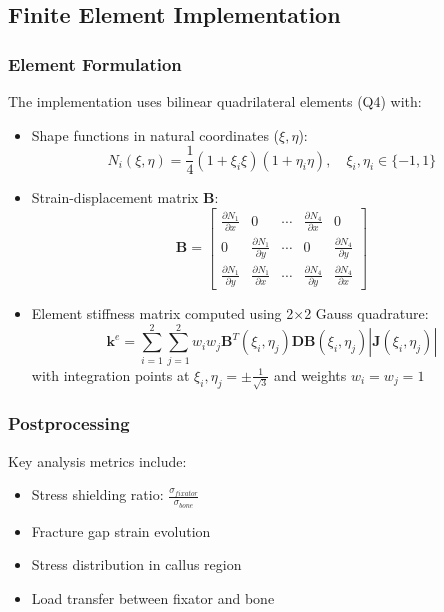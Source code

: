 \documentclass{article}
\begin{document}
\subsection{Finite Element Implementation}

\subsubsection{Element Formulation}

The implementation uses bilinear quadrilateral elements (Q4) with:
\begin{itemize}
  \item Shape functions in natural coordinates ($\xi,\eta$):
  \[
  N_i(\xi,\eta) = \frac{1}{4}(1+\xi_i\xi)(1+\eta_i\eta), \quad \xi_i,\eta_i \in \{-1,1\}
  \]
  \item Strain-displacement matrix $\mathbf{B}$:
  \[
  \mathbf{B} = \begin{bmatrix}
  \frac{\partial N_1}{\partial x} & 0 & \cdots & \frac{\partial N_4}{\partial x} & 0 \\
  0 & \frac{\partial N_1}{\partial y} & \cdots & 0 & \frac{\partial N_4}{\partial y} \\
  \frac{\partial N_1}{\partial y} & \frac{\partial N_1}{\partial x} & \cdots & \frac{\partial N_4}{\partial y} & \frac{\partial N_4}{\partial x}
  \end{bmatrix}
  \]
  \item Element stiffness matrix computed using 2×2 Gauss quadrature:
  \[
  \mathbf{k}^e = \sum_{i=1}^2\sum_{j=1}^2 w_iw_j\mathbf{B}^T(\xi_i,\eta_j)\mathbf{D}\mathbf{B}(\xi_i,\eta_j)|\mathbf{J}(\xi_i,\eta_j)|
  \]
  with integration points at $\xi_i,\eta_j = \pm\frac{1}{\sqrt{3}}$ and weights $w_i=w_j=1$
\end{itemize}

\subsubsection{Postprocessing}

Key analysis metrics include:
\begin{itemize}
  \item Stress shielding ratio: $\frac{\sigma_{fixator}}{\sigma_{bone}}$
  \item Fracture gap strain evolution
  \item Stress distribution in callus region
  \item Load transfer between fixator and bone
\end{itemize}
\end{document}
